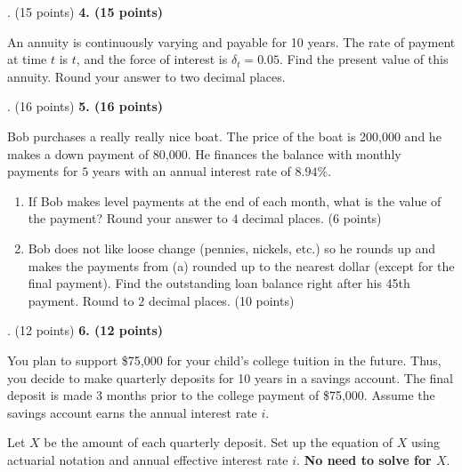 \documentclass[12pt]{article}
\makeatletter
\newenvironment{problem}[1][]{%
  \bigskip%
  \noindent\begin{boxedminipage}{\columnwidth}%
  \def\@tempa{#1}%
  \ifx\@tempa\empty\else%
    \textbf{#1}\hspace{0.5em}%
  \fi%
}{%
  \end{boxedminipage}%
}
\makeatother
\begin{document}
\newpage

\newpage
\begin{problem}[4. (15 points)]
An annuity is continuously varying and payable for 10 years. The rate of payment at time \(t\) is \(t\), and the force of interest is \(\delta_t = 0.05\). Find the present value of this annuity. Round your answer to two decimal places.
\end{problem}

\newpage

\newpage
\begin{problem}[5. (16 points)]
Bob purchases a really really nice boat. The price of the boat is 200,000 and he makes a down payment of 80,000. He finances the balance with monthly payments for $5$ years with an annual interest rate of $8.94\%$.
\begin{enumerate}
    \item[(a)] If Bob makes level payments at the end of each month, what is the value of the payment? Round your answer to $4$ decimal places. (6 points)
    \item[(b)] Bob does not like loose change (pennies, nickels, etc.) so he rounds up and makes the payments from (a) rounded up to the nearest dollar (except for the final payment). Find the outstanding loan balance right after his 45th payment. Round to $2$ decimal places. (10 points)
\end{enumerate}
\end{problem}

\newpage

\newpage
\begin{problem}[6. (12 points)]
You plan to support \$75{,}000 for your child’s college tuition in the future.  
Thus, you decide to make quarterly deposits for 10 years in a savings account.  
The final deposit is made 3 months prior to the college payment of \$75{,}000.  
Assume the savings account earns the annual interest rate \(i\).  

\bigskip

Let \(X\) be the amount of each quarterly deposit. Set up the equation of \(X\) using actuarial notation and annual effective interest rate \(i\).  
\textbf{No need to solve for \(X\)}.
\end{problem}

\newpage
\end{document}
